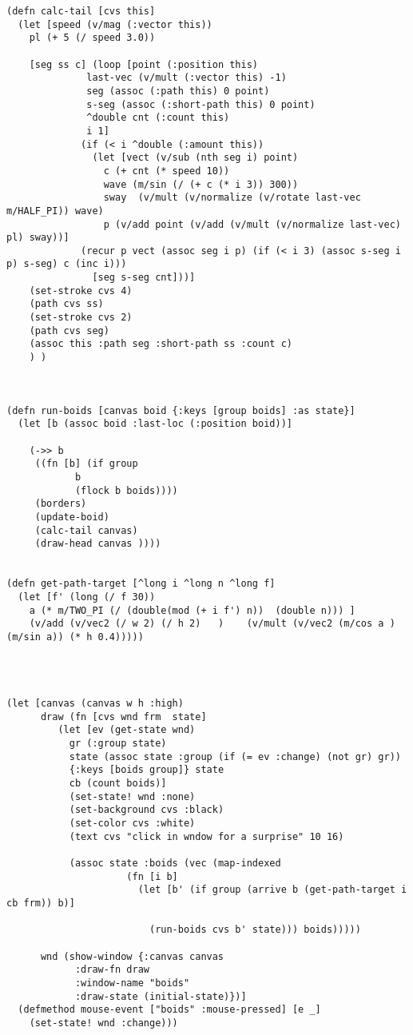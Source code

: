 \documentclass[11pt]{article}
\begin{document}
\begin{verbatim}
(defn calc-tail [cvs this]
  (let [speed (v/mag (:vector this))
	pl (+ 5 (/ speed 3.0)) 

	[seg ss c] (loop [point (:position this)
			  last-vec (v/mult (:vector this) -1)
			  seg (assoc (:path this) 0 point)
			  s-seg (assoc (:short-path this) 0 point)
			  ^double cnt (:count this)
			  i 1]
		     (if (< i ^double (:amount this))
		       (let [vect (v/sub (nth seg i) point)
			     c (+ cnt (* speed 10))
			     wave (m/sin (/ (+ c (* i 3)) 300))
			     sway  (v/mult (v/normalize (v/rotate last-vec  m/HALF_PI)) wave)
			     p (v/add point (v/add (v/mult (v/normalize last-vec) pl) sway))]
			 (recur p vect (assoc seg i p) (if (< i 3) (assoc s-seg i p) s-seg) c (inc i)))
		       [seg s-seg cnt]))]
    (set-stroke cvs 4)
    (path cvs ss)
    (set-stroke cvs 2)
    (path cvs seg)
    (assoc this :path seg :short-path ss :count c)
    ) )



(defn run-boids [canvas boid {:keys [group boids] :as state}]
  (let [b (assoc boid :last-loc (:position boid))]

    (->> b
	 ((fn [b] (if group
		    b
		    (flock b boids))))
	 (borders)
	 (update-boid)
	 (calc-tail canvas)
	 (draw-head canvas ))))


(defn get-path-target [^long i ^long n ^long f]
  (let [f' (long (/ f 30))
	a (* m/TWO_PI (/ (double(mod (+ i f') n))  (double n))) ]
    (v/add (v/vec2 (/ w 2) (/ h 2)   )    (v/mult (v/vec2 (m/cos a ) (m/sin a)) (* h 0.4)))))




(let [canvas (canvas w h :high)
      draw (fn [cvs wnd frm  state]
	     (let [ev (get-state wnd)
		   gr (:group state)
		   state (assoc state :group (if (= ev :change) (not gr) gr))
		   {:keys [boids group]} state
		   cb (count boids)]
	       (set-state! wnd :none)
	       (set-background cvs :black)
	       (set-color cvs :white)
	       (text cvs "click in wndow for a surprise" 10 16)

	       (assoc state :boids (vec (map-indexed
					 (fn [i b]
					   (let [b' (if group (arrive b (get-path-target i cb frm)) b)]

					     (run-boids cvs b' state))) boids)))))

      wnd (show-window {:canvas canvas
			:draw-fn draw
			:window-name "boids"
			:draw-state (initial-state)})]
  (defmethod mouse-event ["boids" :mouse-pressed] [e _]
    (set-state! wnd :change)))

\end{verbatim}
\end{document}
